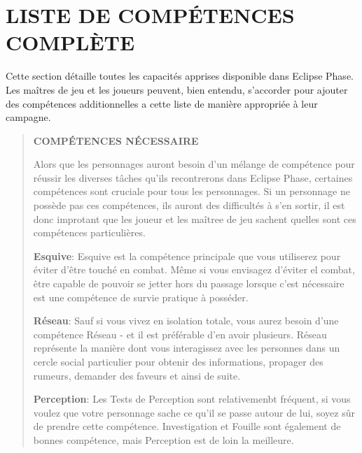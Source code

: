 \section{LISTE DE COMPÉTENCES COMPLÈTE} 





Cette section détaille toutes les capacités apprises disponible dans Eclipse Phase. Les maîtres de jeu et les joueurs peuvent, bien entendu, s'accorder pour ajouter des compétences additionnelles a cette liste de manière appropriée à leur campagne. 

\begin{quotation} \textbf{COMPÉTENCES NÉCESSAIRE} 

Alors que les personnages auront besoin d'un mélange de compétence pour réussir les diverses tâches qu'ils recontrerons dans Eclipse Phase, certaines compétences sont cruciale pour tous les personnages. Si un personnage ne possède pas ces compétences, ils auront des difficultés à s'en sortir, il est donc improtant que les joueur et les maîtree de jeu sachent quelles sont ces compétences particulières. 

\textbf{Esquive}: Esquive est la compétence principale que vous utiliserez pour éviter d'être touché en combat. Même si vous envisagez d'éviter el combat, être capable de pouvoir se jetter hors du passage lorsque c'est nécessaire est une compétence de survie pratique à posséder. 

\textbf{Réseau}: Sauf si vous vivez en isolation totale, vous aurez besoin d'une compétence Réseau - et il est préférable d'en avoir plusieurs. Réseau représente la manière dont vous interagissez avec les personnes dans un cercle social particulier pour obtenir des informations, propager des rumeurs, demander des faveurs et ainsi de suite. 

\textbf{Perception}: Les Tests de Perception sont relativemenbt fréquent, si vous voulez que votre personnage sache ce qu'il se passe autour de lui, soyez sûr de prendre cette compétence. Investigation et Fouille sont également de bonnes compétence, mais Perception est de loin la meilleure. \end{quotation} 



